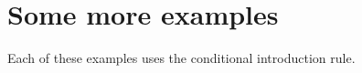 





\section{Some more examples}

Each of these examples uses the conditional introduction rule.


